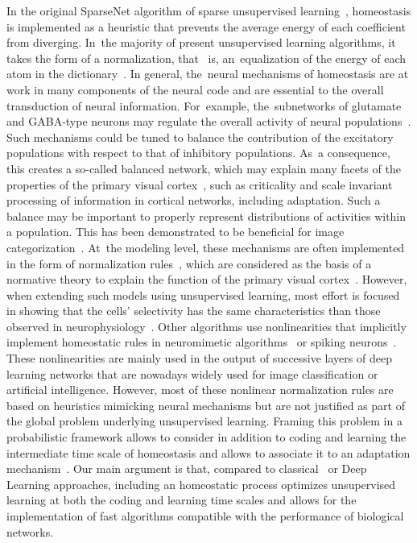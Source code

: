 \documentclass[vision,article,accept,oneauthor,pdftex]{Definitions/mdpi}
\begin{document}
In the original {\sc SparseNet} algorithm of sparse unsupervised learning~\citep{Olshausen97}, homeostasis is implemented as a heuristic that prevents the average energy of each coefficient from diverging. In~the majority of present unsupervised learning algorithms, it takes the form of a normalization, that~ is, an~equalization of the energy of each atom in the dictionary~\citep{Mairal14}.
In general, the~neural mechanisms of homeostasis are at work in many components of the neural code and are essential to the overall transduction of neural information. For~example, the~subnetworks of glutamate and GABA-type neurons may regulate the overall activity of neural populations~\citep{Marder2006variability}. Such mechanisms could be tuned to balance the contribution of the excitatory populations with respect to that of inhibitory populations. As~a consequence, this creates a so-called balanced network, which may explain many facets of the properties of the primary visual cortex~\citep{Hansel12}, such as criticality and scale invariant processing of information in cortical networks, including adaptation. Such a balance may be important to properly represent distributions of activities within a population. This has been demonstrated to be beneficial for image categorization~\citep{PerrinetBednar15}. At~the modeling level, these mechanisms are often implemented in the form of normalization rules~\citep{Schwartz01}, which are considered as the basis of a normative theory to explain the function of the primary visual cortex~\citep{Carandini12}. However, when extending such models using unsupervised learning, most effort is focused in showing that the cells' selectivity has the same characteristics than those observed in neurophysiology~\citep{Ringach02,Rehn07,Loxley17}. Other algorithms use nonlinearities that implicitly implement homeostatic rules in neuromimetic algorithms~\citep{Brito16} or spiking neurons~\citep{Perrinet03}. These nonlinearities are mainly used in the output of successive layers of deep learning networks that are nowadays widely used for image classification or artificial intelligence. However, most of these nonlinear normalization rules are based on heuristics mimicking neural mechanisms but are not justified as part of the global problem underlying unsupervised learning. Framing this problem in a probabilistic framework allows to consider in addition to coding and learning the intermediate time scale of homeostasis and allows to associate it to an adaptation mechanism~\citep{Rao99}. Our main argument is that, compared to classical~\citep{Olshausen97} or Deep Learning approaches, including an homeostatic process optimizes unsupervised learning at both the coding and learning time scales and allows for the implementation of fast algorithms compatible with the performance of biological networks. %
\end{document}
